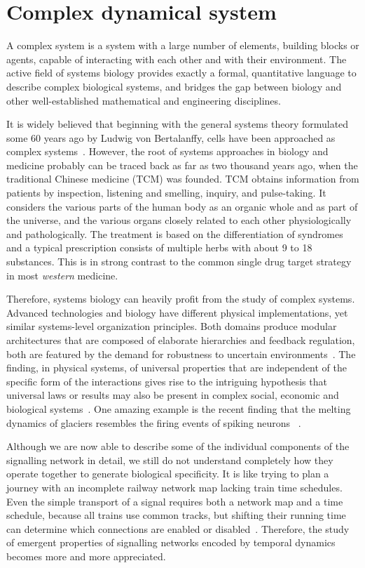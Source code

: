 \section{Complex dynamical system}
A complex system is a system with a large number of
elements, building blocks or agents, capable of interacting
with each other and with their environment.
The
active field of systems biology provides exactly a formal,
quantitative language to describe complex biological 
systems, and
bridges the gap between biology and other well-established
mathematical and engineering disciplines. 

It is widely believed that beginning with the general 
systems theory formulated some 
60 years ago by Ludwig von Bertalanffy, cells have been
approached as complex systems~\citep{Lazebnik2002a}. 
However, the root of systems approaches in biology and
medicine probably can be traced back as far as two 
thousand years
ago, when the traditional Chinese medicine (TCM) was 
founded. TCM obtains information from patients by 
inspection, 
listening and smelling, inquiry, and pulse-taking. 
It considers the various parts of the 
human body as an organic whole and as part of the 
universe, and the various organs closely 
related to each other physiologically and pathologically. 
The treatment is based on the 
differentiation of syndromes and a typical prescription
consists of multiple herbs with about 9 to 18 substances.
This is in strong contrast to the common single drug
target strategy in most \emph{western} medicine.

Therefore, systems biology can heavily profit from the
study of complex systems.
Advanced technologies and biology have different physical
implementations, yet similar systems-level organization
principles. Both domains produce modular architectures that are composed of elaborate hierarchies and feedback regulation, both are featured by the demand for
robustness to uncertain environments~\citep{Csete2002}.
The
finding, in physical systems, of universal properties that
are independent of the specific form of the interactions
gives rise to the intriguing hypothesis that universal laws
or results may also be present in complex social, economic
and biological systems~\citep{Amaral2004}. One amazing 
example is 
the recent finding that the melting dynamics of glaciers
resembles the firing events of spiking neurons~%
\citep{Chapuis2012}.

Although we are now able to describe some of the individual 
components of the 
signalling network in detail, we still do not understand completely how they operate together to generate biological specificity. It is like trying to plan a journey with an incomplete railway network map lacking train time schedules. Even the simple transport of a signal requires both a network map and a time schedule,
because all trains use common tracks, but shifting their 
running time can determine which connections are enabled or disabled~\citep{Kholodenko2010}.
Therefore, the study of emergent properties of signalling networks encoded by temporal dynamics becomes more and more
appreciated.

